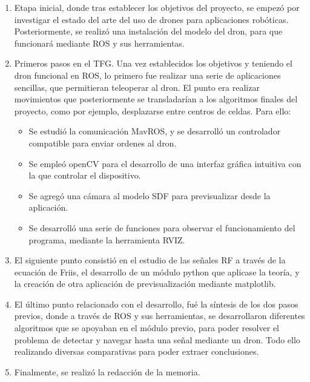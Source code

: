 \begin{enumerate}
	\item Etapa inicial, donde tras establecer los objetivos del proyecto, se empezó por investigar el estado del arte del uso de drones para aplicaciones robóticas. Posteriormente, se realizó una instalación del modelo del dron, para que funcionará mediante ROS y sus herramientas. 
	\item Primeros pasos en el \ac{TFG}. Una vez establecidos los objetivos y teniendo el dron funcional en ROS, lo primero fue realizar una serie de aplicaciones sencillas, que permitieran teleoperar al dron. El punto era realizar movimientos que posteriormente se transladarían a los algoritmos finales del proyecto, como por ejemplo, desplazarse entre centros de celdas. Para ello:
	\begin{itemize}
		\item Se estudió la comunicación MavROS, y se desarrolló un controlador compatible para enviar ordenes al dron.
		\item Se empleó openCV para el desarrollo de una interfaz gráfica intuitiva con la que controlar el dispositivo.
		\item Se agregó una cámara al modelo SDF para previsualizar desde la aplicación.
		\item Se desarrolló una serie de funciones para observar el funcionamiento del programa, mediante la herramienta RVIZ.
    \end{itemize}
	\item El siguiente punto consistió en el estudio de las señales \ac{RF} a través de la ecuación de Friis, el desarrollo de un módulo python que aplicase la teoría, y la creación de otra aplicación de previsualización mediante matplotlib.
	\item El último punto relacionado con el desarrollo, fué la síntesis de los dos pasos previos, donde a través de \ac{ROS} y sus herramientas, se desarrollaron diferentes algoritmos que se apoyaban en el módulo previo, para poder resolver el problema de detectar y navegar hasta una señal mediante un dron. Todo ello realizando diversas comparativas para poder extraer conclusiones.
	\item Finalmente, se realizó la redacción de la memoria.
\end{enumerate}